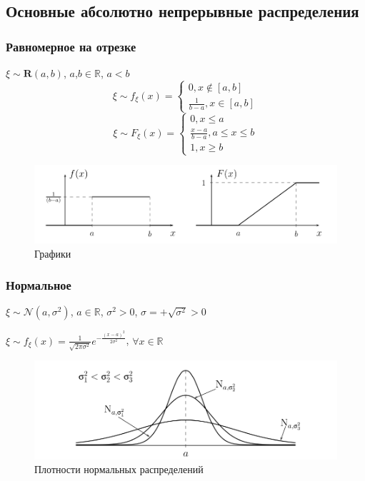 \subsection{Основные абсолютно непрерывные распределения}
\subsubsection{Равномерное на отрезке}
$\xi \sim \boldsymbol{R}(a,b)$, $a$,$b \in \mathbb{R}$, $a < b$
\begin{equation*}
	\xi \sim f_{\xi}(x) = 
		\begin{cases}
			0 , x \notin [a,b] \\			
			\frac{1}{b-a}, x \in [a,b]
		\end{cases}
\end{equation*}
\begin{equation*}
	\xi \sim F_{\xi}(x) = 
		\begin{cases}
			0 , x \leq a \\			
			\frac{x-a}{b-a}, a \leq x \leq b \\
			1 , x \geq b
		\end{cases}
\end{equation*}
\begin{figure}[H]
      \centering
      \includegraphics[width=0.8\linewidth]{img/ravnom1.png}
      \caption{Графики}
\end{figure}
\subsubsection{Нормальное}
$\xi \sim \mathcal{N}(a,\sigma^{2})$, $a \in \mathbb{R}$, $\sigma^{2} > 0$, $\sigma = +\sqrt{\sigma^{2}} > 0$

$\xi \sim f_{\xi}(x) = \frac{1}{\sqrt{2\pi\sigma^{2}}}e^{-\frac{(x-a)^{2}}{2\sigma^{2}}}$, $\forall x \in \mathbb{R}$
\begin{figure}[H]
      \centering
      \includegraphics[width=0.8\linewidth]{img/plotnorm.png}
      \caption{Плотности нормальных распределений}
\end{figure}

